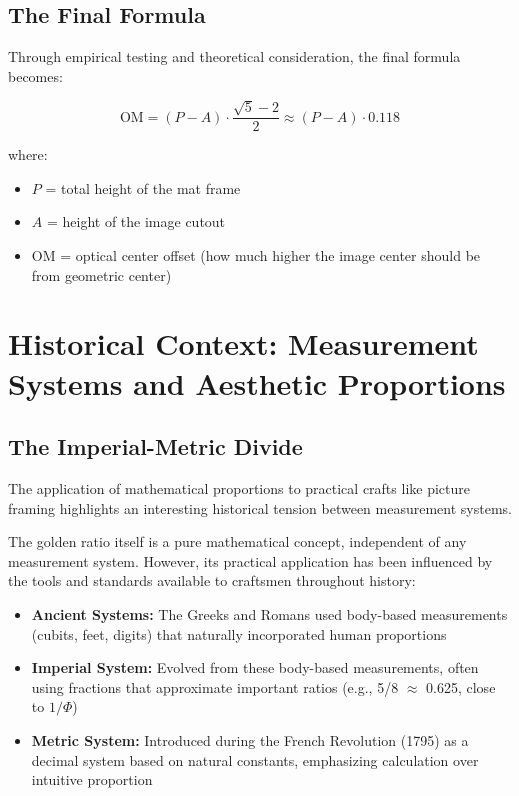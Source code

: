 \documentclass[12pt,a4paper]{article}
\begin{document}
\subsection{The Final Formula}

Through empirical testing and theoretical consideration, the final formula becomes:

\begin{equation}
  \boxed{\text{OM} = (P - A) \cdot \frac{\sqrt{5} - 2}{2} \approx (P - A) \cdot 0.118}
  \label{OM4}
\end{equation}

where:

\begin{itemize}
    \item $P$ = total height of the mat frame
    \item $A$ = height of the image cutout
    \item $\text{OM}$ = optical center offset (how much higher the image center should be from geometric center)
\end{itemize}

\section{Historical Context: Measurement Systems and Aesthetic Proportions}

\subsection{The Imperial-Metric Divide}

The application of mathematical proportions to practical crafts like picture framing highlights an interesting historical tension between measurement systems.

The golden ratio itself is a pure mathematical concept, independent of any measurement system. However, its practical application has been influenced by the tools and standards available to craftsmen throughout history:

\begin{itemize}
    \item \textbf{Ancient Systems:} The Greeks and Romans used body-based measurements (cubits, feet, digits) that naturally incorporated human proportions

    \item \textbf{Imperial System:} Evolved from these body-based measurements, often using fractions that approximate important ratios (e.g., 5/8 $\approx$ 0.625, close to $1/\Phi$)

    \item \textbf{Metric System:} Introduced during the French Revolution (1795) as a decimal system based on natural constants, emphasizing calculation over intuitive proportion
\end{itemize}
\end{document}
